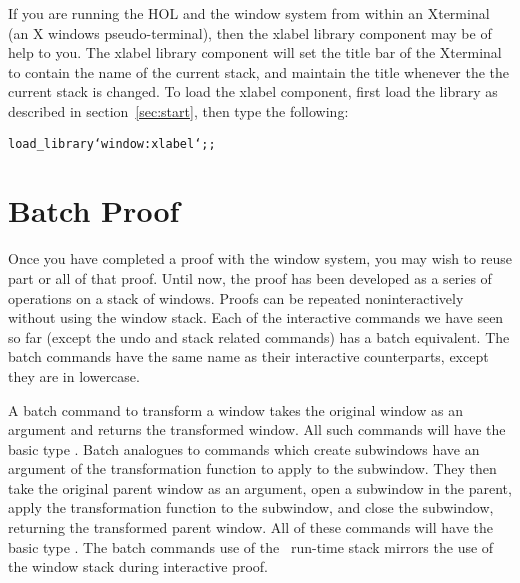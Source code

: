 If you are running the HOL and the window system from within an Xterminal
(an X windows pseudo-terminal),
then the xlabel library component may be of help to you.
The xlabel library component will set the title bar of the Xterminal
to contain the name of the current stack, and maintain the title whenever the
the current stack is changed.
To load the xlabel component, first load the library as described in
section~\ref{sec:start}, then type the following:
\begin{hol}\begin{alltt}
	load_library `window:xlabel`;;
\end{alltt}\end{hol}

\section{Batch Proof}

Once you have completed a proof with the window system, you may wish to
reuse part or all of that proof.
Until now, the proof has been developed as a series of operations on a stack
of windows.
Proofs can be repeated noninteractively without using the window stack.
Each of the interactive commands we have seen so far
(except the undo and stack related commands)
has a batch equivalent.
The batch commands have the same name as their interactive
counterparts, except they are in lowercase.

A batch command to transform a window
takes the original window as an argument and returns the transformed window.
All such commands will have the basic type .
Batch analogues to commands which create subwindows
have an argument of the transformation function to apply to the subwindow.
They then take the original parent window as an argument,
open a subwindow in the parent,
apply the transformation function to the subwindow,
and close the subwindow,
returning the transformed parent window.
All of these commands will have the basic type 
.
The batch commands use of the \ML\ run-time stack 
mirrors the use of the window stack during interactive proof.

